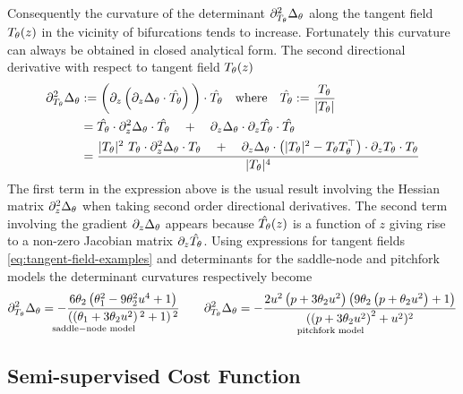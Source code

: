 Consequently the curvature of the determinant $\partial_{T_{\theta}}^2\Delta_{\theta}$ along the tangent field $T_{\theta}(z)$ in the vicinity of bifurcations tends to increase. Fortunately this curvature can always be obtained in closed analytical form. The second directional derivative with respect to tangent field $T_{\theta}(z)$
\begin{align}
    \partial_{T_{\theta}}^2\Delta_{\theta} &:=
    \bigg(
        \partial_z\left(
            \partial_z\Delta_{\theta} \cdot \hat{T_{\theta}}
        \right)
    \bigg)\cdot \hat{T_{\theta}}\quad
    \mathrm{where} \quad \hat{T_{\theta}}:=\frac{T_{\theta}}{|T_{\theta}|}\\
    &=
    \hat{T_{\theta}}\cdot\partial_z^2\Delta_{\theta}\cdot\hat{T_{\theta}}
    \quad+\quad
    \partial_z\Delta_{\theta}\cdot\partial_z\hat{T_{\theta}}\cdot\hat{T_{\theta}}\\
    & = \frac{
        |T_{\theta}|^2\,\,
        T_{\theta}\cdot\partial_z^2\Delta_{\theta}\cdot T_{\theta}
        \quad+\quad
        \partial_z\Delta_{\theta}\cdot
        \left(
        |T_{\theta}|^2-T_{\theta}T_{\theta}^\top
        \right)\cdot\partial_zT_{\theta}
        \cdot T_{\theta}
    }
    {|T_{\theta}|^4}
\end{align}
The first term in the expression above is the usual result involving the Hessian matrix $\partial_z^2\Delta_{\theta}$ when taking second order directional derivatives. The second term involving the gradient $\partial_z\Delta_{\theta}$ appears because $\hat{T_{\theta}}(z)$ is a function of $z$ giving rise to a non-zero Jacobian matrix $\partial_z \hat{T_{\theta}}$. Using expressions for tangent fields \eqref{eq:tangent-field-examples} and determinants for the saddle-node and pitchfork models the determinant curvatures respectively become
\begin{align}
    \underset{\mathrm{saddle-node\,\,model}}{
    \partial_{T_{\theta}}^2\Delta_{\theta} =
    -\frac{6 \theta_2 \left(\theta _1^2-9 \theta _2^2 u^4+1\right)}
    {\left(\left(\theta _1+3 \theta _2 u^2\right){}^2+1\right){}^2}}
    \qquad
    \underset{\mathrm{pitchfork\,\,model}}{
    \partial_{T_{\theta}}^2\Delta_{\theta} =
    -\frac{2 u^2 \left(p+3 \theta _2 u^2\right) \left(9 \theta _2 \left(p+\theta _2 u^2\right)+1\right)}{
    ( \left(p+3 \theta _2 u^2\right)^2+u^2 )^2
    }}
\end{align}
\subsection{Semi-supervised Cost Function}

